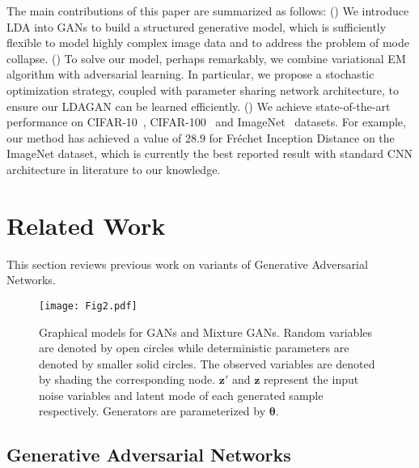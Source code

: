\documentclass{article}
\begin{document}
The main contributions of this paper are summarized as follows:
() We introduce LDA into GANs to build a structured generative model, which is sufficiently flexible to model highly complex image data and to address the problem of mode collapse.
() To solve our model, perhaps remarkably, we combine variational EM algorithm with adversarial learning.  In particular, we propose a stochastic optimization strategy, coupled with parameter sharing network architecture, to ensure our LDAGAN can be learned efficiently.
() We achieve state-of-the-art performance on CIFAR-10~\cite{krizhevsky2009learning}, CIFAR-100~\cite{krizhevsky2009learning} and ImageNet~\cite{russakovsky2015imagenet} datasets. For example, our method has achieved a value of $28.9$ for Fr\'{e}chet Inception Distance on the ImageNet dataset, which is currently the best reported result with standard CNN architecture in literature to our knowledge.



\section{Related Work}
\label{sec:Previous}

This section reviews previous work on variants of Generative Adversarial Networks.
\begin{figure}
  \centering
    \texttt{[image: Fig2.pdf]}
     \caption{Graphical models for GANs and Mixture GANs. Random variables are denoted by open circles while deterministic parameters are denoted by smaller solid circles. The observed variables are denoted by shading the corresponding node. $\mathbf{z}'$ and $\mathbf{z}$ represent the input noise variables and latent mode of each generated sample respectively. Generators are parameterized by $\bm{\theta}$.}
     \label{fig:GANs}
\end{figure}

\subsection{Generative Adversarial Networks}
\label{sec:GANs}
\end{document}

